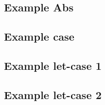 \documentclass[../master.tex]{subfiles}
\begin{document}
\subsection{Example Abs}


\subsection{Example case}


\newpage

\subsection{Example let-case 1}
\begin{figure}[H]
	\setlength\tabcolsep{8pt}
	
	\label{fig:LetCase1}
\end{figure}

\subsection{Example let-case 2}
\begin{figure}[H]
	\setlength\tabcolsep{8pt}
	
	\label{fig:LetCase2}
\end{figure}
\end{document}
